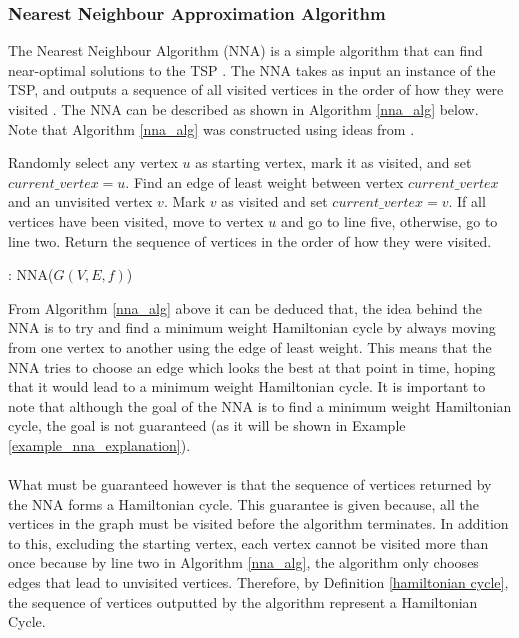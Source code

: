 \documentclass[12pt]{article}
\numberwithin{equation}{subsection}
\numberwithin{table}{subsection}
\numberwithin{algorithm}{subsection}
\begin{document}
\subsubsection{Nearest Neighbour Approximation Algorithm}
\label{nna_section}
The Nearest Neighbour Algorithm (NNA) is a simple algorithm that can find near-optimal solutions to the TSP \cite{arora_agarwal_tanwar_2016}. The NNA takes as input an instance of the TSP, and outputs a sequence of all visited vertices in the order of how they were visited \cite{arora_agarwal_tanwar_2016}. The NNA can be described as shown in Algorithm \ref{nna_alg} below. Note that Algorithm \ref{nna_alg} was constructed using ideas from \cite{arora_agarwal_tanwar_2016}.
\begin{algorithm}[H]
\begin{algorithmic}[1]
\State Randomly select any vertex $u$ as starting vertex, mark it as visited, and set $current\_vertex = u$.
\State Find an edge of least weight between vertex $current\_vertex$ and an unvisited vertex $v$.
\State Mark $v$ as visited and set $current\_vertex = v$.
\State If all vertices have been visited, move to vertex $u$ and go to line five, otherwise, go to line two.
\State Return the sequence of vertices in the order of how they were visited.
\caption{: NNA($G(V,E,f)$)}
\label{nna_alg}
\end{algorithmic}
\end{algorithm}
From Algorithm \ref{nna_alg} above it can be deduced that, the idea behind the NNA is to try and find a minimum weight Hamiltonian cycle by always moving from one vertex to another using the edge of least weight. This means that the NNA tries to choose an edge which looks the best at that point in time, hoping that it would lead to a minimum weight Hamiltonian cycle. It is important to note that although the goal of the NNA is to find a minimum weight Hamiltonian cycle, the goal is not guaranteed (as it will be shown in Example \ref{example_nna_explanation}).
\\\\What must be guaranteed however is that the sequence of vertices returned by the NNA forms a Hamiltonian cycle. This guarantee is given because, all the vertices in the graph must be visited before the algorithm terminates. In addition to this, excluding the starting vertex, each vertex cannot be visited more than once because by line two in Algorithm \ref{nna_alg}, the algorithm only chooses edges that lead to unvisited vertices. Therefore, by Definition \ref{hamiltonian cycle}, the sequence of vertices outputted by the algorithm represent a Hamiltonian Cycle.
\end{document}
